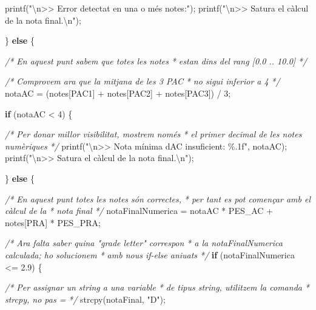 \documentclass[
]{book}
\newenvironment{Shaded}{\begin{snugshade}}{\end{snugshade}}
\newcommand{\CommentTok}[1]{\textcolor[rgb]{0.56,0.35,0.01}{\textit{#1}}}
\newcommand{\ControlFlowTok}[1]{\textcolor[rgb]{0.13,0.29,0.53}{\textbf{#1}}}
\newcommand{\DecValTok}[1]{\textcolor[rgb]{0.00,0.00,0.81}{#1}}
\newcommand{\FloatTok}[1]{\textcolor[rgb]{0.00,0.00,0.81}{#1}}
\newcommand{\NormalTok}[1]{#1}
\newcommand{\SpecialCharTok}[1]{\textcolor[rgb]{0.00,0.00,0.00}{#1}}
\newcommand{\StringTok}[1]{\textcolor[rgb]{0.31,0.60,0.02}{#1}}
\begin{document}
\begin{Shaded}
\begin{Highlighting}[]
\NormalTok{        printf(}\StringTok{"}\SpecialCharTok{\textbackslash{}n}\StringTok{\textgreater{}\textgreater{} Error detectat en una o més notes:"}\NormalTok{);}
\NormalTok{        printf(}\StringTok{"}\SpecialCharTok{\textbackslash{}n}\StringTok{\textgreater{}\textgreater{} S\textquotesingle{}atura el càlcul de la nota final.}\SpecialCharTok{\textbackslash{}n}\StringTok{"}\NormalTok{);}

\NormalTok{    \} }\ControlFlowTok{else}\NormalTok{ \{}

        \CommentTok{/* En aquest punt sabem que totes les notes}
\CommentTok{         * estan dins del rang [0.0 .. 10.0]}
\CommentTok{         */}

        \CommentTok{/* Comprovem ara que la mitjana de les 3 PAC }
\CommentTok{         * no sigui inferior a 4}
\CommentTok{         */}
\NormalTok{        notaAC = (notes[PAC1] + notes[PAC2] + notes[PAC3]) / }\DecValTok{3}\NormalTok{;}

        \ControlFlowTok{if}\NormalTok{ (notaAC \textless{} }\DecValTok{4}\NormalTok{) \{}

           \CommentTok{/* Per donar millor visibilitat, mostrem només}
\CommentTok{            * el primer decimal de les notes numèriques}
\CommentTok{            */}
\NormalTok{           printf(}\StringTok{"}\SpecialCharTok{\textbackslash{}n}\StringTok{\textgreater{}\textgreater{} Nota mínima d\textquotesingle{}AC insuficient: \%.1f"}\NormalTok{, notaAC);}
\NormalTok{           printf(}\StringTok{"}\SpecialCharTok{\textbackslash{}n}\StringTok{\textgreater{}\textgreater{} S\textquotesingle{}atura el càlcul de la nota final.}\SpecialCharTok{\textbackslash{}n}\StringTok{"}\NormalTok{);}

\NormalTok{        \} }\ControlFlowTok{else}\NormalTok{ \{}

            \CommentTok{/* En aquest punt totes les notes són correctes,}
\CommentTok{             * per tant es pot començar amb el càlcul de la }
\CommentTok{             * nota final}
\CommentTok{             */}
\NormalTok{            notaFinalNumerica = notaAC * PES\_AC + notes[PRA] * PES\_PRA;}

            \CommentTok{/* Ara falta saber quina "grade letter" correspon}
\CommentTok{             * a la notaFinalNumerica calculada; ho solucionem}
\CommentTok{             * amb nous if{-}else aniuats}
\CommentTok{             */}
            \ControlFlowTok{if}\NormalTok{ (notaFinalNumerica \textless{}= }\FloatTok{2.9}\NormalTok{) \{}

                \CommentTok{/* Per assignar un string a una variable}
\CommentTok{                 * de tipus string, utilitzem la comanda}
\CommentTok{                 * strcpy, no pas \textquotesingle{}=\textquotesingle{}}
\CommentTok{                 */}
\NormalTok{                strcpy(notaFinal, }\StringTok{"D"}\NormalTok{);}


\end{Highlighting}
\end{Shaded}
\end{document}
